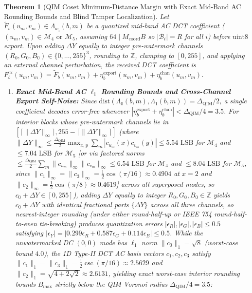\documentclass[conference,10pt]{IEEEtran}
\newtheorem{theorem}{Theorem}
\begin{document}
\begin{theorem}[QIM Coset Minimum-Distance Margin with Exact Mid-Band AC Rounding Bounds and Blind Tamper Localization]
\label{thm:qim_resilience}
Let $\widetilde{F}_b(u_m, v_m) \in \Lambda_{w_i}(b,m)$ be a quantized mid-band AC DCT coefficient ($(u_m, v_m) \in \mathcal{M}_4 \text{ or } \mathcal{M}_5$, assuming $64 \mid M_{\text{coord}} B$ so $|\mathcal{B}_i| = R$ for all $i$) before $\mathrm{uint8}$ export. Upon adding $\Delta Y$ equally to integer pre-watermark channels $(R_0, G_0, B_0) \in \{0,\dots,255\}^3$, rounding to $\mathbb{Z}$, clamping to $[0, 255]$, and applying an external channel perturbation, the received DCT coefficient is $F^{\text{rx}}_b(u_m, v_m) = \widetilde{F}_b(u_m, v_m) + \eta^{\text{export}}_b(u_m, v_m) + \eta^{\text{chan}}_b(u_m, v_m)$.
\begin{enumerate}
    \item \textbf{Exact Mid-Band AC $\ell_1$ Rounding Bounds and Cross-Channel Export Self-Noise:} Since $\mathrm{dist}(\Lambda_0(b,m), \Lambda_1(b,m)) = \Delta_{\text{QIM}}/2$, a single coefficient decodes error-free whenever $|\eta^{\text{export}}_b + \eta^{\text{chan}}_b| < \Delta_{\text{QIM}}/4 = 3.5$. For interior blocks whose pre-watermark channels lie in $[\lceil \|\Delta Y\|_\infty \rceil, 255 - \lceil \|\Delta Y\|_\infty \rceil]$ (where $\|\Delta Y\|_\infty \le \frac{\Delta_{\text{QIM}}}{2}\max_{x,y}\sum_{m} |c_{u_m}(x) c_{v_m}(y)| \le 5.54\text{ LSB}$ for $\mathcal{M}_4$ and $\le 7.04\text{ LSB}$ for $\mathcal{M}_5$ [or via factored norms $\le \frac{\Delta_{\text{QIM}}}{2}\sum_m \|c_{u_m}\|_\infty \|c_{v_m}\|_\infty \le 6.54\text{ LSB}$ for $\mathcal{M}_4$ and $\le 8.04\text{ LSB}$ for $\mathcal{M}_5$, since $\|c_1\|_\infty = \|c_3\|_\infty = \frac{1}{2}\cos(\pi/16) \approx 0.4904$ at $x=2$ and $\|c_2\|_\infty = \frac{1}{2}\cos(\pi/8) \approx 0.4619$] across all superposed modes, so $c_0 + \Delta Y \in [0, 255]$), adding $\Delta Y$ equally to integer $R_0, G_0, B_0 \in \mathbb{Z}$ yields $c_0 + \Delta Y$ with identical fractional parts $\{\Delta Y\}$ across all three channels, so nearest-integer rounding (under either round-half-up or IEEE 754 round-half-to-even tie-breaking) produces quantization errors $|\epsilon_R|, |\epsilon_G|, |\epsilon_B| \le 0.5$ satisfying $|\epsilon_Y| = |0.299\epsilon_R + 0.587\epsilon_G + 0.114\epsilon_B| \le 0.5$. While the unwatermarked DC $(0,0)$ mode has $\ell_1$ norm $\|c_0\|_1 = \sqrt{8}$ (worst-case bound $4.0$), the 1D Type-II DCT AC basis vectors $c_1, c_2, c_3$ satisfy $\|c_1\|_1 = \|c_3\|_1 = \frac{1}{2}\csc(\pi/16) \approx 2.5629$ and $\|c_2\|_1 = \sqrt{4 + 2\sqrt{2}} \approx 2.6131$, yielding exact worst-case interior rounding bounds $B_{\max}$ strictly below the QIM Voronoi radius $\Delta_{\text{QIM}}/4 = 3.5$:

\end{enumerate}
\end{theorem}
\end{document}

